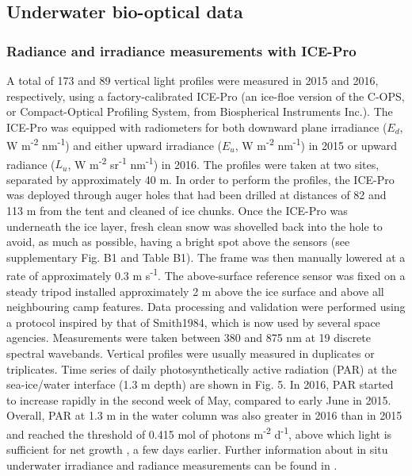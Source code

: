\documentclass[essd, manuscript]{copernicus}
\begin{document}
\subsection{Underwater bio-optical data}

\subsubsection{Radiance and irradiance measurements with ICE-Pro}

A total of 173 and 89 vertical light profiles were measured in 2015 and 2016, respectively, using a factory-calibrated ICE-Pro (an ice-floe version of the C-OPS, or Compact-Optical Profiling System, from Biospherical Instruments Inc.). The ICE-Pro was equipped with radiometers for both downward plane irradiance ($E_d$, W m\textsuperscript{-2} nm\textsuperscript{-1}) and either upward irradiance ($E_u$, W m\textsuperscript{-2} nm\textsuperscript{-1}) in 2015 or upward radiance ($L_u$, W m\textsuperscript{-2} sr\textsuperscript{-1} nm\textsuperscript{-1}) in 2016. The profiles were taken at two sites, separated by approximately 40 m. In order to perform the profiles, the ICE-Pro was deployed through auger holes that had been drilled at distances of 82 and 113  m from the tent and cleaned of ice chunks. Once the ICE-Pro was underneath the ice layer, fresh clean snow was shovelled back into the hole to avoid, as much as possible, having a bright spot above the sensors (see supplementary Fig. B1 and Table B1). The frame was then manually lowered at a rate of approximately 0.3 m s\textsuperscript{-1}. The above-surface reference sensor was fixed on a steady tripod installed approximately 2 m above the ice surface and above all neighbouring camp features. Data processing and validation were performed using a protocol inspired by that of Smith1984, which is now used by several space agencies. Measurements were taken between 380 and 875 nm at 19 discrete spectral wavebands. Vertical profiles were usually measured in duplicates or triplicates. Time series of daily photosynthetically active radiation (PAR) at the sea-ice/water interface (1.3 m depth) are shown in Fig. 5. In 2016, PAR started to increase rapidly in the second week of May, compared to early June in 2015. Overall, PAR at 1.3 m in the water column was also greater in 2016 than in 2015 and reached the threshold of 0.415 mol of photons m\textsuperscript{-2} d\textsuperscript{-1}, above which light is sufficient for net growth \citep{Letelier2004}, a few days earlier. Further information about in situ underwater irradiance and radiance measurements can be found in \citet{Massicotte2018}. 
\end{document}
